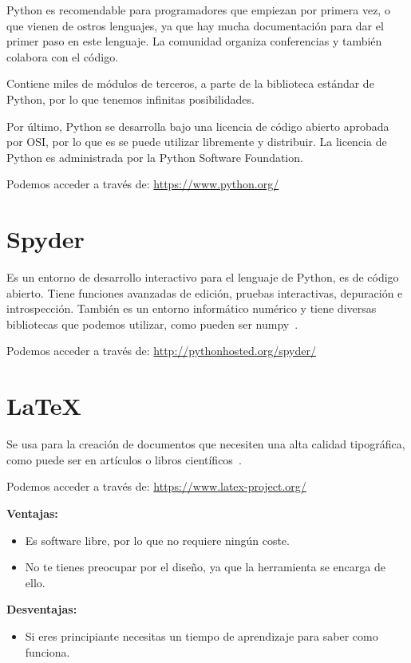 Python es recomendable para programadores que empiezan por primera vez, o que vienen de ostros lenguajes, ya que hay mucha documentación para dar el primer paso en este lenguaje. La comunidad organiza conferencias y también colabora con el código.

Contiene miles de módulos de terceros, a parte de la biblioteca estándar de Python, por lo que tenemos infinitas posibilidades.

Por último, Python se desarrolla bajo una licencia de código abierto aprobada por OSI, por lo que es se puede utilizar libremente y distribuir. La licencia de Python es administrada por la Python Software Foundation. 

Podemos acceder a través de: 
\url{https://www.python.org/}

\section{Spyder}
Es un entorno de desarrollo interactivo para el lenguaje de Python, es de código abierto.
Tiene funciones avanzadas de edición, pruebas interactivas, depuración e introspección. También es un entorno informático numérico y tiene diversas bibliotecas que podemos utilizar, como pueden ser numpy~\cite{spyder}.

Podemos acceder a través de: 
\url{http://pythonhosted.org/spyder/}

\section{\LaTeX}
Se usa para la creación de documentos que necesiten una alta calidad tipográfica, como puede ser en artículos o libros científicos~\cite{latex}.

Podemos acceder a través de: 
\url{https://www.latex-project.org/}

\textbf{Ventajas:}
\begin{itemize}
\item Es software libre, por lo que no requiere ningún coste.
\item No te tienes preocupar por el diseño, ya que la herramienta se encarga de ello.
\end{itemize}

\textbf{Desventajas:}
\begin{itemize}
\item Si eres principiante necesitas un tiempo de aprendizaje para saber como funciona.
\end{itemize}

